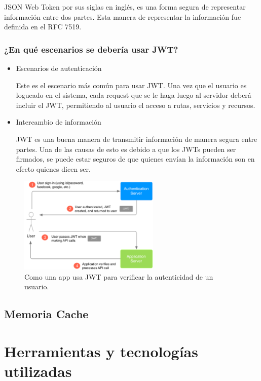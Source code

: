 JSON Web Token por sus siglas en inglés, es una forma segura de representar información 
entre dos partes. Esta manera de representar la información fue definida en el RFC 7519.

\subsubsection{¿En qué escenarios se debería usar JWT?}
\begin{itemize}
	\item Escenarios de autenticación
	
	Este es el escenario más común para usar JWT. Una vez que el usuario es logueado en el 
	sistema, cada request que se le haga luego al servidor deberá incluir el JWT, 
	permitiendo al usuario el acceso a rutas, servicios y recursos. 
	
	\item Intercambio de información
	
	JWT es una buena manera de transmitir información de manera segura entre partes. Una 
	de las causas de esto es debido a que los JWTs pueden ser firmados, se puede estar 
	seguros de que quienes envían la información son en efecto quienes dicen ser. 
\end{itemize}

\begin{figure}[htbp!] 
\centering    
\includegraphics[width=0.6\textwidth]{jwt1}
\caption[JWT]{Como una app usa JWT para verificar la autenticidad de un usuario.}
\label{fig:jwt-auth-user}
\end{figure}

\subsection{Memoria Cache}


\section{Herramientas y tecnologías utilizadas}

